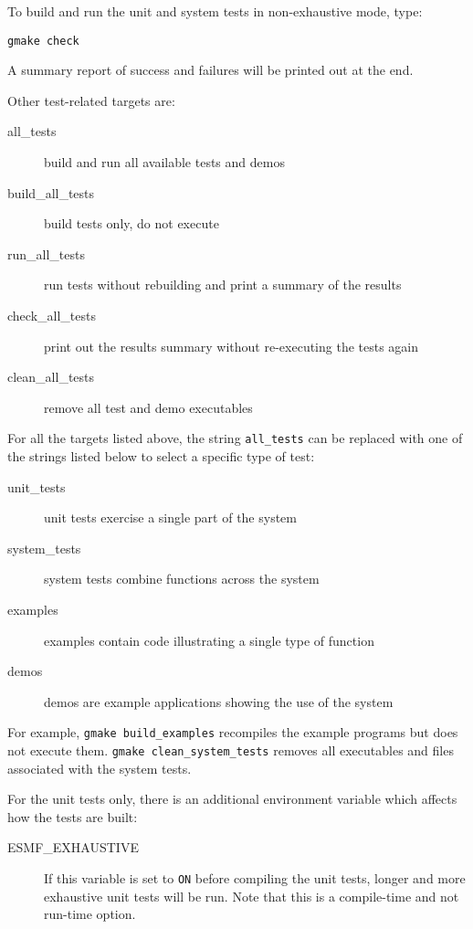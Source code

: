 To build and run the unit and system tests in non-exhaustive mode, type:
\begin{verbatim}
gmake check
\end{verbatim}
A summary report of success and failures will be printed out at the end.

\noindent Other test-related targets are:
\begin{description}
\item[all\_tests] build and run all available tests and demos
\item[build\_all\_tests] build tests only, do not execute
\item[run\_all\_tests] run tests without rebuilding and print a
summary of the results
\item[check\_all\_tests] 
print out the results summary without re-executing the tests again
\item[clean\_all\_tests] remove all test and demo executables 
\end{description}

For all the targets listed above, the string {\tt all\_tests} can be
replaced with one of the strings listed below to select a
specific type of test:
\begin{description}
\item[unit\_tests] unit tests exercise a single part of the system
\item[system\_tests] system tests combine functions across the system
\item[examples] examples contain code illustrating a single type of function
\item[demos] demos are example applications showing the use of the system
\end{description}
For example, {\tt gmake build\_examples} recompiles the example programs but 
does not execute them.  {\tt gmake clean\_system\_tests} removes all
executables and files associated with the system tests.

For the unit tests only, there is an additional environment variable
which affects how the tests are built:
\begin{description}
\item[ESMF\_EXHAUSTIVE]
If this variable is set to {\tt ON} before compiling the unit tests,
longer and more exhaustive unit tests will be run.  Note that this is a
compile-time and not run-time option.
\end{description}

